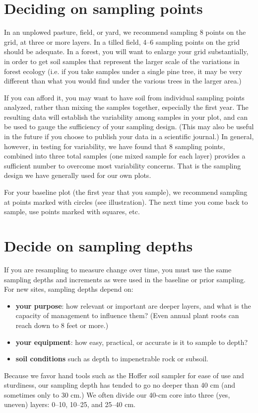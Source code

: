 \documentclass[11pt,letterpaper,twoside,onecolumn]{memoir}
\begin{document}
\section*{Deciding on sampling points}
In an unplowed pasture, field, or yard, we recommend sampling 8 points on the grid, at three or more layers. In a tilled field, 4--6 sampling points on the grid should be adequate. In a forest, you will want to enlarge your grid substantially, in order to get soil samples that represent the larger scale of the variations in forest ecology (i.e. if you take samples under a single pine tree, it may be very different than what you would find under the various trees in the larger area.) 

If you can afford it, you may want to have soil from individual sampling points analyzed, rather than mixing the samples together, especially the first year. The resulting data will establish the variability among samples in your plot, and can be used to gauge the sufficiency of your sampling design. (This may also be useful in the future if you choose to publish your data in a scientific journal.)  In general, however, in testing for variability, we have found that 8 sampling points, combined into three total samples (one mixed sample for each layer) provides a sufficient number to overcome most variability concerns. That is the sampling design we have generally used for our own plots.

For your baseline plot (the first year that you sample), we recommend sampling at points marked with circles (see illustration). The next time you come back to sample, use points marked with squares, etc. 

\section*{Decide on sampling depths}

If you are resampling to measure change over time, you must use the same sampling depths and increments as were used in the baseline or prior sampling. For new sites, sampling depths depend on: 
\begin{itemize}
\item[] \textbf{your purpose}: how relevant or important are deeper layers, and what is the capacity of management to influence them? (Even annual plant roots can reach down to 8 feet or more.)
\item[] \textbf{your equipment}: how easy, practical, or accurate is it to sample to depth?
\item[] \textbf{soil conditions} such as depth to impenetrable rock or subsoil.

\end{itemize}
Because we favor hand tools such as the Hoffer soil sampler for ease of use and sturdiness, our sampling depth has tended to go no deeper than 40 cm (and sometimes only to 30 cm.) We often divide our 40-cm core into three (yes, uneven) layers: 0--10, 10--25, and 25--40 cm. 
\end{document}

